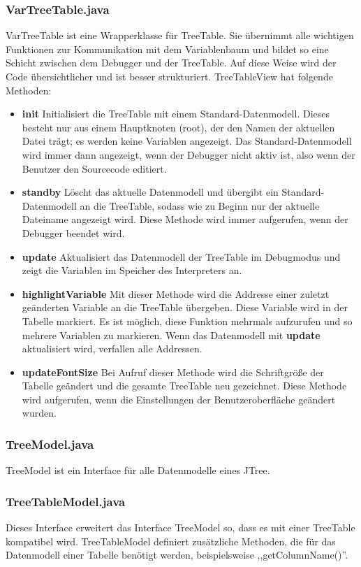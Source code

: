 \subsubsection*{VarTreeTable.java}
VarTreeTable ist eine Wrapperklasse für TreeTable. Sie übernimmt alle wichtigen Funktionen zur Kommunikation mit dem Variablenbaum und bildet so eine Schicht zwischen dem Debugger und der TreeTable. Auf diese Weise wird der Code übersichtlicher und ist besser strukturiert.
TreeTableView hat folgende Methoden:
\begin{itemize}
\item \textbf{init} Initialisiert die TreeTable mit einem Standard-Datenmodell. Dieses besteht nur aus einem Hauptknoten (root), der den Namen der aktuellen Datei trägt; es werden keine Variablen angezeigt. Das Standard-Datenmodell wird immer dann angezeigt, wenn der Debugger nicht aktiv ist, also wenn der Benutzer den Sourcecode editiert.
\item \textbf{standby} Löscht das aktuelle Datenmodell und übergibt ein Standard-Datenmodell an die TreeTable, sodass wie zu Beginn nur der aktuelle Dateiname angezeigt wird. Diese Methode wird immer aufgerufen, wenn der Debugger beendet wird.
\item \textbf{update} Aktualisiert das Datenmodell der TreeTable im Debugmodus und zeigt die Variablen im Speicher des Interpreters an.
\item \textbf{highlightVariable} Mit dieser Methode wird die Addresse einer zuletzt geänderten Variable an die TreeTable übergeben. Diese Variable wird in der Tabelle markiert. Es ist möglich, diese Funktion mehrmals aufzurufen und so mehrere Variablen zu markieren. Wenn das Datenmodell mit \textbf{update} aktualisiert wird, verfallen alle Addressen.
\item \textbf{updateFontSize} Bei Aufruf dieser Methode wird die Schriftgröße der Tabelle geändert und die gesamte TreeTable neu gezeichnet. Diese Methode wird aufgerufen, wenn die Einstellungen der Benutzeroberfläche geändert wurden.
\end{itemize}

\subsubsection*{TreeModel.java}
TreeModel ist ein Interface für alle Datenmodelle eines JTree.

\subsubsection*{TreeTableModel.java}
Dieses Interface erweitert das Interface TreeModel so, dass es mit einer TreeTable kompatibel wird. TreeTableModel definiert zusätzliche Methoden, die für das Datenmodell einer Tabelle benötigt werden, beispielsweise ,,getColumnName()''.

